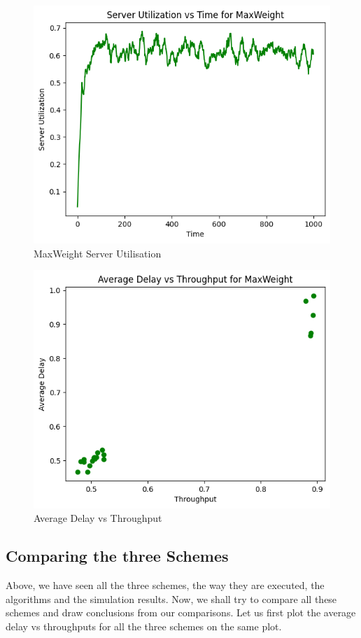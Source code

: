 \documentclass[11pt, a4paper]{article}
\begin{document}
\begin{figure}[H]
     \centering
     \includegraphics[scale=0.5]{fig_5.png}
     \caption{MaxWeight Server Utilisation}
\end{figure}

\begin{figure}[H]
     \centering
     \includegraphics[scale=0.5]{fig_6.png}
     \caption{Average Delay vs Throughput}
\end{figure}

\subsection{Comparing the three Schemes}
Above, we have seen all the three schemes, the way they are executed, the algorithms and the simulation results. Now, we shall try to compare all these schemes and draw conclusions from our comparisons. 
Let us first plot the average delay vs throughputs for all the three schemes on the same plot.
\end{document}
